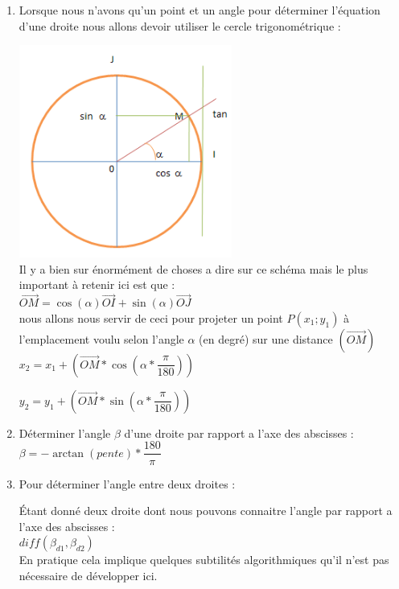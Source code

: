 \documentclass[a4paper,11pt]{article}
\begin{document}
\begin{enumerate}[label=-]

\item 
Lorsque nous n'avons qu'un point et un angle pour déterminer l'équation d'une droite nous allons devoir utiliser le cercle trigonométrique : 

\includegraphics[width=0.55\textwidth]{cercletrigo.PNG}\\

Il y a bien sur énormément de choses a dire sur ce schéma mais le plus important à retenir ici est que : \\

$ \vec{OM} = \cos( \alpha ) \vec{OI} 
		   + \sin( \alpha ) \vec{OJ}     $\\
		   
nous allons nous servir de ceci pour projeter un point $P(x_1;y_1)$ à l'emplacement voulu selon l'angle $\alpha$ (en degré) sur une distance $(\vec{OM})$\\

$ x_2 = x_1 + ( \vec{OM} * \cos(\alpha * \dfrac{\pi}{180})) $ 

$ y_2 = y_1 + ( \vec{OM} * \sin(\alpha * \dfrac{\pi}{180})) $ \\

\item 
Déterminer l'angle $\beta$ d'une droite par rapport a l'axe des abscisses : \\

$ \beta = - \arctan (pente) * \dfrac{180}{\pi} $ \\


\item
Pour déterminer l'angle entre deux droites :

Étant donné deux droite dont nous pouvons connaitre l'angle par rapport a l'axe des abscisses :  \\

$ diff(\beta_{d1},\beta_{d2}) $\\

En pratique cela implique quelques subtilités algorithmiques qu'il n'est pas nécessaire de développer ici.

\end{enumerate}
\end{document}
